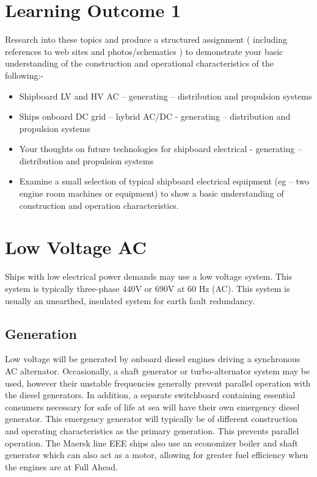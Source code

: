 \documentclass[11pt,a4paper]{article}
\begin{document}
\section*{Learning Outcome 1}
\begin{tcolorbox}[colback=red!5!white,colframe=red!75!black,title=\textbf{Demonstrate basic knowledge of the implementation of satisfactory safety procedures}]
Research into these topics and produce a structured assignment ( including references to web sites and photos/schematics ) to demonstrate your basic understanding of the construction and operational characteristics of the following:-
\begin{itemize}
\item Shipboard LV and HV AC – generating – distribution and propulsion systems
\item Ships onboard DC grid – hybrid AC/DC - generating – distribution and propulsion systems
\item Your thoughts on future technologies for shipboard electrical - generating – distribution and propulsion systems
\item Examine a small selection of typical shipboard electrical equipment (eg – two engine room machines or equipment) to show a basic understanding of construction and operation characteristics.
\end{itemize}
\end{tcolorbox}
\section{Low Voltage AC}
Ships with low electrical power demands may use a low voltage system. This system is typically three-phase 440V or 690V at 60 Hz (AC). This system is usually an unearthed, insulated system for earth fault redundancy.
\subsection*{Generation}
Low voltage will be generated by onboard diesel engines driving a synchronous AC alternator. Occasionally, a shaft generator or turbo-alternator system may be used, however their unstable frequencies generally prevent parallel operation with the diesel generators. In addition, a separate switchboard containing essential consumers necessary for safe of life at sea will have their own emergency diesel generator. This emergency generator will typically be of different construction and operating characteristics as the primary generation. This prevents parallel operation. The Maersk line EEE ships also use an economizer boiler and shaft generator which can also act as a motor, allowing for greater fuel efficiency when the engines are at Full Ahead.
\end{document}
